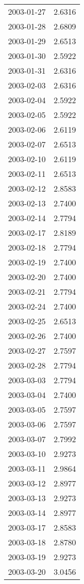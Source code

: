\begin{tabular}{lr}
2003-01-27 &      2.6316 \\
2003-01-28 &      2.6809 \\
2003-01-29 &      2.6513 \\
2003-01-30 &      2.5922 \\
2003-01-31 &      2.6316 \\
2003-02-03 &      2.6316 \\
2003-02-04 &      2.5922 \\
2003-02-05 &      2.5922 \\
2003-02-06 &      2.6119 \\
2003-02-07 &      2.6513 \\
2003-02-10 &      2.6119 \\
2003-02-11 &      2.6513 \\
2003-02-12 &      2.8583 \\
2003-02-13 &      2.7400 \\
2003-02-14 &      2.7794 \\
2003-02-17 &      2.8189 \\
2003-02-18 &      2.7794 \\
2003-02-19 &      2.7400 \\
2003-02-20 &      2.7400 \\
2003-02-21 &      2.7794 \\
2003-02-24 &      2.7400 \\
2003-02-25 &      2.6513 \\
2003-02-26 &      2.7400 \\
2003-02-27 &      2.7597 \\
2003-02-28 &      2.7794 \\
2003-03-03 &      2.7794 \\
2003-03-04 &      2.7400 \\
2003-03-05 &      2.7597 \\
2003-03-06 &      2.7597 \\
2003-03-07 &      2.7992 \\
2003-03-10 &      2.9273 \\
2003-03-11 &      2.9864 \\
2003-03-12 &      2.8977 \\
2003-03-13 &      2.9273 \\
2003-03-14 &      2.8977 \\
2003-03-17 &      2.8583 \\
2003-03-18 &      2.8780 \\
2003-03-19 &      2.9273 \\
2003-03-20 &      3.0456 \\

\end{tabular}
